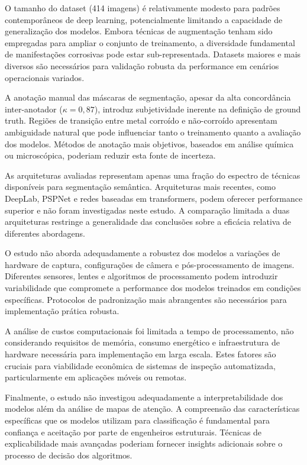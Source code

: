 \documentclass[12pt,a4paper,twoside]{article}
\begin{document}
O tamanho do dataset (414 imagens) é relativamente modesto para padrões contemporâneos de deep learning, potencialmente limitando a capacidade de generalização dos modelos. Embora técnicas de augmentação tenham sido empregadas para ampliar o conjunto de treinamento, a diversidade fundamental de manifestações corrosivas pode estar sub-representada. Datasets maiores e mais diversos são necessários para validação robusta da performance em cenários operacionais variados.

A anotação manual das máscaras de segmentação, apesar da alta concordância inter-anotador ($\kappa = 0,87$), introduz subjetividade inerente na definição de ground truth. Regiões de transição entre metal corroído e não-corroído apresentam ambiguidade natural que pode influenciar tanto o treinamento quanto a avaliação dos modelos. Métodos de anotação mais objetivos, baseados em análise química ou microscópica, poderiam reduzir esta fonte de incerteza.

As arquiteturas avaliadas representam apenas uma fração do espectro de técnicas disponíveis para segmentação semântica. Arquiteturas mais recentes, como DeepLab, PSPNet e redes baseadas em transformers, podem oferecer performance superior e não foram investigadas neste estudo. A comparação limitada a duas arquiteturas restringe a generalidade das conclusões sobre a eficácia relativa de diferentes abordagens.

O estudo não aborda adequadamente a robustez dos modelos a variações de hardware de captura, configurações de câmera e pós-processamento de imagens. Diferentes sensores, lentes e algoritmos de processamento podem introduzir variabilidade que compromete a performance dos modelos treinados em condições específicas. Protocolos de padronização mais abrangentes são necessários para implementação prática robusta.

A análise de custos computacionais foi limitada a tempo de processamento, não considerando requisitos de memória, consumo energético e infraestrutura de hardware necessária para implementação em larga escala. Estes fatores são cruciais para viabilidade econômica de sistemas de inspeção automatizada, particularmente em aplicações móveis ou remotas.

Finalmente, o estudo não investigou adequadamente a interpretabilidade dos modelos além da análise de mapas de atenção. A compreensão das características específicas que os modelos utilizam para classificação é fundamental para confiança e aceitação por parte de engenheiros estruturais. Técnicas de explicabilidade mais avançadas poderiam fornecer insights adicionais sobre o processo de decisão dos algoritmos.
\end{document}
